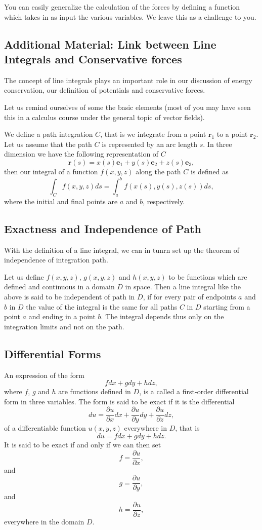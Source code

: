 \documentclass[%
oneside,                 %
final,                   %
10pt]{article}
\begin{document}
You can easily generalize the calculation of the forces by defining a function
which takes in as input the various variables. We leave this as a challenge to you.

\subsection*{Additional Material: Link between Line Integrals and Conservative forces}

The concept of line integrals plays an important role in our discussion of energy conservation,
our definition of potentials and conservative forces.

Let us remind ourselves of some the basic elements (most of you may
have seen this in a calculus course under the general topic of vector
fields).

We define a path integration $C$, that is we integrate
from a point $\bm{r}_1$ to a point $\bm{r}_2$. 
Let us assume that the path $C$ is represented by an arc length $s$. In three dimension we have the following representation of $C$
\[
\bm{r}(s)=x(s)\bm{e}_1+y(s)\bm{e}_2+z(s)\bm{e}_3,
\]
then our integral of a function $f(x,y,z)$ along the path $C$ is defined as 
\[
\int_Cf(x,y,z)ds=\int_a^bf\left(x(s),y(s),z(s)\right)ds,
\]
where the initial and final points are $a$ and $b$, respectively.
\subsection*{Exactness and Independence of Path}

With the definition of a line integral, we can in tunrn set up the
theorem of independence of integration path.

Let us define
$f(x,y,z)$, $g(x,y,z)$ and $h(x,y,z)$ to be functions which are
defined and continuous in a domain $D$ in space. Then a line integral
like the above is said to be independent of path in $D$, if for every
pair of endpoints $a$ and $b$ in $D$ the value of the integral is the
same for all paths $C$ in $D$ starting from a point $a$ and ending in
a point $b$. The integral depends thus only on the integration limits
and not on the path.

\subsection*{Differential Forms}

An expression of the form
\[
fdx+gdy+hdz,
\]
where $f$, $g$ and $h$ are functions defined in $D$, is a called a first-order differential form
in three variables.
The form is said to be exact if it is the differential
\[
du= \frac{\partial u}{\partial x}dx+\frac{\partial u}{\partial y}dy+\frac{\partial u}{\partial z}dz,
\]
of a differentiable function $u(x,y,z)$ everywhere in $D$, that is
\[
du=fdx+gdy+hdz.
\]
It is said to be exact if and only if we can then set
\[
f=\frac{\partial u}{\partial x},
\]
and
\[
g=\frac{\partial u}{\partial y},
\]
and
\[
h=\frac{\partial u}{\partial z},
\]
everywhere in the domain $D$.
\end{document}
